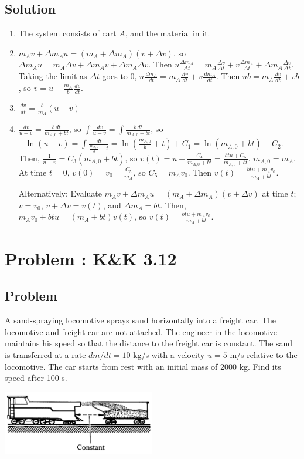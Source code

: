\documentclass[solutions]{esg8012pset}
\renewcommand{\d}{\,d}
\begin{document}
\subsection{Solution}
  \begin{enumerate}
    \item The system consists of cart $A$, and the material in it.
    \item $m_A v + \Delta m_A u = (m_A + \Delta m_A) (v + \Delta v)$, so $\Delta m_A u = m_A \Delta v + \Delta m_A v + \Delta m_A \Delta v$.  Then $u \frac{\Delta m_A}{\Delta t} = m_A\frac{\Delta v}{\Delta t} + v\frac{\Delta m_A}{\Delta t} + \Delta m_A \frac{\Delta v}{\Delta t}$.  Taking the limit as $\Delta t$ goes to 0, $u\frac{\d m_A}{\d t} = m_A \frac{\d v}{\d t} + v\frac{\d m_A}{\d t}$.  Then $ub = m_A \frac{\d v}{\d t} + vb$, so $v = u - \frac{m_A}{b}\frac{\d v}{\d t}$.
    \item $\frac{\d v}{\d t} = \frac{b}{m_A}(u - v)$
    \item $\frac{\d v}{u - v} = \frac{b\d t}{m_{A, 0} + bt}$, so $\int \frac{\d v}{u - v} = \int \frac{b\d t}{m_{A, 0} + bt}$, so $-\ln(u - v) = \int\frac{\d t}{\frac{m_{A,0}}{b} + t} = \ln\left(\frac{m_{A,0}}{b} + t\right) + C_1 = \ln(m_{A,0} + b t) + C_2$.  Then, $\frac{1}{u - v} = C_3 (m_{A,0} + bt)$, so $v(t) = u - \frac{C_4}{m_{A,0} + bt} = \frac{b t u + C_5}{m_{A, 0} + b t}$.  $m_{A, 0} = m_A$.  At time $t = 0$, $v(0) = v_0 = \frac{C_5}{m_A}$, so $C_5 = m_A v_0$.  Then $v(t) = \frac{b t u + m_A v_0}{m_A + b t}$. \par
    Alternatively: Evaluate $m_A v + \Delta m_A u = (m_A + \Delta m_A) (v + \Delta v)$ at time $t$; $v = v_0$, $v + \Delta v = v(t)$, and $\Delta m_A = b t$.  Then, $m_A v_0 + b t u = (m_A + b t)v(t)$, so $v(t) = \frac{b t u + m_A v_0}{m_A + b t}$.
  \end{enumerate}
\section{Problem \thesection: K\&K 3.12}
\subsection{Problem}
  A sand-spraying locomotive sprays sand horizontally into a freight car. The locomotive and freight car are not attached. The engineer in the locomotive maintains his speed so that the distance to the freight car is constant. The sand is transferred at a rate $d m / d t = 10$ kg/s with a velocity $u = 5$ m/s relative to the locomotive. The car starts from rest with an initial mass of 2000 kg. Find its speed after 100 s.
  \begin{center}\includegraphics[width=0.5\textwidth]{ps_04_3}\end{center}
\end{document}
